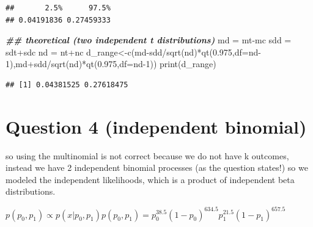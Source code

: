 \documentclass[
]{book}
\newenvironment{Shaded}{\begin{snugshade}}{\end{snugshade}}
\newcommand{\AttributeTok}[1]{\textcolor[rgb]{0.77,0.63,0.00}{#1}}
\newcommand{\DecValTok}[1]{\textcolor[rgb]{0.00,0.00,0.81}{#1}}
\newcommand{\DocumentationTok}[1]{\textcolor[rgb]{0.56,0.35,0.01}{\textbf{\textit{#1}}}}
\newcommand{\FloatTok}[1]{\textcolor[rgb]{0.00,0.00,0.81}{#1}}
\newcommand{\FunctionTok}[1]{\textcolor[rgb]{0.00,0.00,0.00}{#1}}
\newcommand{\NormalTok}[1]{#1}
\newcommand{\OtherTok}[1]{\textcolor[rgb]{0.56,0.35,0.01}{#1}}
\newcommand{\SpecialCharTok}[1]{\textcolor[rgb]{0.00,0.00,0.00}{#1}}
\theoremstyle{definition}
\theoremstyle{definition}
\theoremstyle{definition}
\theoremstyle{definition}
\theoremstyle{remark}
\begin{document}
\begin{verbatim}
##       2.5%      97.5% 
## 0.04191836 0.27459333
\end{verbatim}

\begin{Shaded}
\begin{Highlighting}[]
  \DocumentationTok{\#\# theoretical (two independent t distributions)}
\NormalTok{  md }\OtherTok{=}\NormalTok{ mt}\SpecialCharTok{{-}}\NormalTok{mc}
\NormalTok{  sdd }\OtherTok{=}\NormalTok{ sdt}\SpecialCharTok{+}\NormalTok{sdc}
\NormalTok{  nd }\OtherTok{=}\NormalTok{ nt}\SpecialCharTok{+}\NormalTok{nc}
\NormalTok{  d\_range}\OtherTok{\textless{}{-}}\FunctionTok{c}\NormalTok{(md}\SpecialCharTok{{-}}\NormalTok{sdd}\SpecialCharTok{/}\FunctionTok{sqrt}\NormalTok{(nd)}\SpecialCharTok{*}\FunctionTok{qt}\NormalTok{(}\FloatTok{0.975}\NormalTok{,}\AttributeTok{df=}\NormalTok{nd}\DecValTok{{-}1}\NormalTok{),md}\SpecialCharTok{+}\NormalTok{sdd}\SpecialCharTok{/}\FunctionTok{sqrt}\NormalTok{(nd)}\SpecialCharTok{*}\FunctionTok{qt}\NormalTok{(}\FloatTok{0.975}\NormalTok{,}\AttributeTok{df=}\NormalTok{nd}\DecValTok{{-}1}\NormalTok{))}
  \FunctionTok{print}\NormalTok{(d\_range)}
\end{Highlighting}
\end{Shaded}

\begin{verbatim}
## [1] 0.04381525 0.27618475
\end{verbatim}

\hypertarget{question-4-independent-binomial}{%
\section*{Question 4 (independent binomial)}\label{question-4-independent-binomial}}

so using the multinomial is not correct because we do not have k outcomes, instead we have 2 independent binomial processes (as the question states!) so we modeled the independent likelihoods, which is a product of independent beta distributions.

\(p(p_0,p_1) \propto p(x| p_0,p_1)p(p_0,p_1) = p_0^{38.5}(1-p_0)^{634.5}p_1^{21.5}(1-p_1)^{657.5}\)
\end{document}
